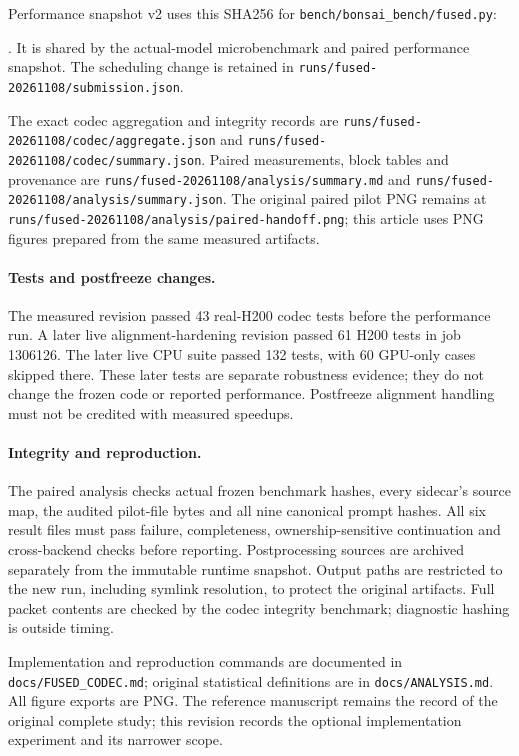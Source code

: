 \documentclass[10pt,twocolumn,letterpaper]{article}
\begin{document}
Performance snapshot v2 uses this SHA256 for
{\small\nolinkurl{bench/bonsai_bench/fused.py}}:
\par{}.
It is shared by the actual-model microbenchmark and paired performance
snapshot. The scheduling change is retained in
{\small\nolinkurl{runs/fused-20261108/submission.json}}.

The exact codec aggregation and integrity records are
{\small\nolinkurl{runs/fused-20261108/codec/aggregate.json}} and
{\small\nolinkurl{runs/fused-20261108/codec/summary.json}}. Paired measurements,
block tables and provenance are
{\small\nolinkurl{runs/fused-20261108/analysis/summary.md}} and
{\small\nolinkurl{runs/fused-20261108/analysis/summary.json}}. The original paired
pilot PNG remains at
{\small\nolinkurl{runs/fused-20261108/analysis/paired-handoff.png}}; this article
uses PNG figures prepared from the same measured artifacts.

\paragraph{Tests and postfreeze changes.}
The measured revision passed 43 real-H200 codec tests before the performance
run. A later live alignment-hardening revision passed 61 H200 tests in job
1306126. The later live CPU suite passed 132 tests, with 60 GPU-only cases
skipped there. These later tests are separate robustness evidence; they do not
change the frozen code or reported performance. Postfreeze alignment handling
must not be credited with measured speedups.

\paragraph{Integrity and reproduction.}
The paired analysis checks actual frozen benchmark hashes, every sidecar's
source map, the audited pilot-file bytes and all nine canonical prompt hashes.
All six result files must pass failure, completeness, ownership-sensitive
continuation and cross-backend checks before reporting. Postprocessing sources
are archived separately from the immutable runtime snapshot. Output paths are
restricted to the new run, including symlink resolution, to protect the
original artifacts. Full packet contents are checked by the codec integrity
benchmark; diagnostic hashing is outside timing.

Implementation and reproduction commands are documented in
{\small\nolinkurl{docs/FUSED_CODEC.md}}; original statistical definitions are in
{\small\nolinkurl{docs/ANALYSIS.md}}. All figure exports are PNG. The reference
manuscript remains the record of the original complete study; this revision
records the optional implementation experiment and its narrower scope.



\end{document}
